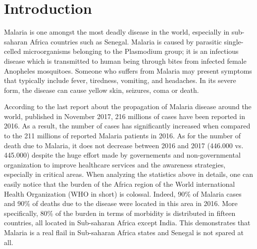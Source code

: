 \section{Introduction}\label{intro}

Malaria is one amongst the most deadly disease in the world, especially in sub-saharan Africa countries such as Senegal.
Malaria is caused by parasitic single-celled microorganisms belonging to the Plasmodium group; it is an infectious
disease which is transmitted to human being through bites from infected female Anopheles mosquitoes. Someone who suffers
from  Malaria may present symptoms that typically include fever, tiredness, vomiting, and headaches. In its severe form,
the disease can cause yellow skin, seizures, coma or death.

According to the last report about the propagation of Malaria disease around the world, published in November 2017, 216 millions of cases have been 
reported in 2016. As a result, the number of cases has significantly increased when compared to the 211 millions of reported Malaria patients in 2016.
As for the number of death due to Malaria, it does not decrease between 2016 and 2017 (446.000 vs. 445.000) despite the huge effort made by governements
and non-governmental organization to improve healthcare services and the awareness strategies, especially in critical areas. 
When analyzing the statistics above in details, one can easily notice that the burden of the Africa region of the World 
international Health Organization (WHO in short) is colossal. Indeed, 90\% of Malaria cases and 90\% of deaths due to the disease were located in this area in 2016.
More specifically, 80\% of the burden in terms of morbidity is distributed in fifteen countries, all located in Sub-saharan Africa except India. This demonstrates
that Malaria is a real flail in Sub-saharan Africa states and Senegal is not spared at all.


